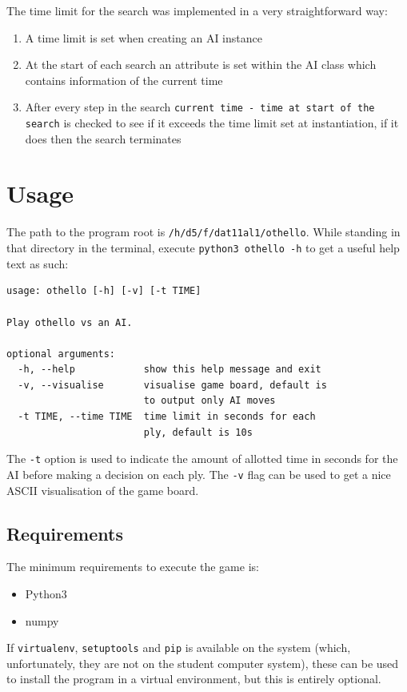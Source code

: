 \documentclass{article}
\begin{document}
The time limit for the search was implemented in a very straightforward way:

\begin{enumerate}
    \item A time limit is set when creating an AI instance
    \item At the start of each search an attribute is set within the AI class which contains information of the current time
    \item After every step in the search \texttt{current time - time at start of the search} is checked to see if it exceeds the time limit set at instantiation, if it does then the search terminates
\end{enumerate}

\section{Usage}
The path to the program root is \texttt{/h/d5/f/dat11al1/othello}. While standing in that directory in the terminal, execute \texttt{python3 othello -h} to get a useful help text as such: 
\begin{lstlisting}
usage: othello [-h] [-v] [-t TIME]

Play othello vs an AI.

optional arguments:
  -h, --help            show this help message and exit
  -v, --visualise       visualise game board, default is
                        to output only AI moves
  -t TIME, --time TIME  time limit in seconds for each
                        ply, default is 10s
\end{lstlisting}

The \texttt{-t} option is used to indicate the amount of allotted time in seconds for the AI before making a decision on each ply. The \texttt{-v} flag can be used to get a nice ASCII visualisation of the game board. 

\subsection{Requirements}
The minimum requirements to execute the game is:
\begin{itemize}
    \item Python3
    \item numpy
\end{itemize}

If \texttt{virtualenv}, \texttt{setuptools} and \texttt{pip} is available on the system (which, unfortunately, they are not on the student computer system), these can be used to install the program in a virtual environment, but this is entirely optional.
\end{document}
